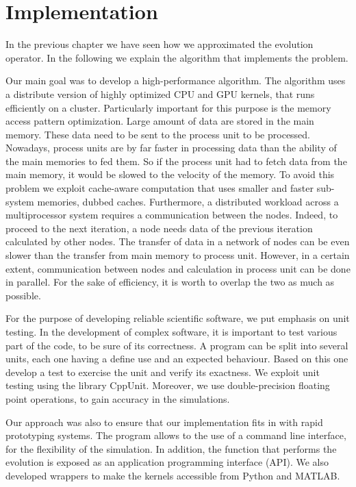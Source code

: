 \chapter{Implementation}


In the previous chapter we have seen how we approximated the evolution operator. In the following we explain the algorithm that implements the problem.

Our main goal was to develop a high-performance algorithm. The algorithm uses a distribute version of highly optimized CPU and GPU kernels, that runs efficiently on a cluster. Particularly important for this purpose is the memory access pattern optimization. Large amount of data are stored in the main memory. These data need to be sent to the process unit to be processed. Nowadays, process units are by far faster in processing data than the ability of the main memories to fed them. So if the process unit had to fetch data from the main memory, it would be slowed to the velocity of the memory. To avoid this problem we exploit cache-aware computation that uses smaller and faster sub-system memories, dubbed caches. 
Furthermore, a distributed workload across a multiprocessor system requires a communication between the nodes. Indeed, to proceed to the next iteration, a node needs data of the previous iteration calculated by other nodes. The transfer of data in a network of nodes can be even slower than the transfer from main memory to process unit. However, in a certain extent, communication between nodes and calculation in process unit can be done in parallel. For the sake of efficiency, it is worth to overlap the two as much as possible.

For the purpose of developing reliable scientific software, we put emphasis on unit testing. In the development of complex software, it is important to test various part of the code, to be sure of its correctness. A program can be split into several units, each one having a define use and an expected behaviour. Based on this one develop a test to exercise the unit and verify its exactness. We exploit unit testing using the library CppUnit. Moreover, we use double-precision floating point operations, to gain accuracy in the simulations.

Our approach was also to ensure that our implementation fits in with rapid prototyping
systems. The program allows to the use of a command line interface, for the flexibility of the simulation. In addition, the function that performs the evolution is exposed as an application programming interface (API). We also developed wrappers to make the kernels accessible from Python and MATLAB.

